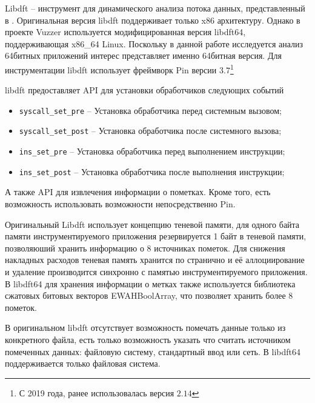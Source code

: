 Libdft -- инструмент для динамического анализа потока данных, представленный в \cite{libdft}. Оригинальная версия libdft поддерживает только x86 архитектуру. Однако в проекте Vuzzer \cite{vuzzer} используется модифицированная версия libdft64, поддерживающая x86\_64 Linux. Поскольку в данной работе исследуется анализ 64битных приложений интерес представляет именно 64битная версия.
Для инструментации libdft использует фреймворк Pin версии $3.7$\footnote{С 2019 года, ранее использовалась версия $2.14$}



libdft предоставляет API для установки обработчиков следующих событий
\begin{itemize}
    \item \texttt{syscall\_set\_pre} -- Установка обработчика перед системным вызовом;
    \item \texttt{syscall\_set\_post} -- Установка обработчика после системного вызова;
    \item \texttt{ins\_set\_pre} -- Установка обработчика перед выполнением инструкции;
    \item \texttt{ins\_set\_post} -- Установка обработчика после выполнения инструкции;
\end{itemize}
А также API для извлечения информации о пометках. Кроме того, есть возможность использовать возможности непосредственно Pin.

Оригинальный Libdft использует концепцию теневой памяти, для одного байта памяти инструментируемого приложения резервируется 1 байт в теневой памяти, позволяюший хранить информацию о 8 источниках пометок. Для снижения накладных расходов теневая память хранится по странично и её аллоциирование и удаление производится синхронно с памятью инструментируемого приложения.
В libdft64 для хранения информации о метках также используется библиотека сжатовых битовых векторов EWAHBoolArray, что позволяет хранить более 8 пометок.

В оригинальном libdft отсутствует возможность помечать данные только из конкретного файла, есть только возможность указать что считать источником помеченных данных: файловую систему, стандартный ввод или сеть.
В libdft64 поддерживается только файловая система.

